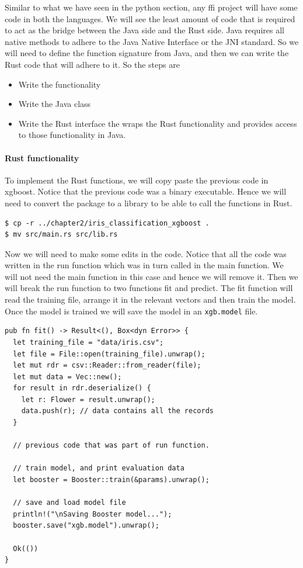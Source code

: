 \documentclass{book}
\begin{document}
Similar to what we have seen in the python section, any ffi project will have some code in both the languages. We will see the least amount of code that is required to act as the bridge between the Java side and the Rust side. Java requires all native methods to adhere to the Java Native Interface or the JNI standard. So we will need to define the function signature from Java, and then we can write the Rust code that will adhere to it. So the steps are

\begin{itemize}
	\item Write the functionality
	\item Write the Java class
	\item Write the Rust interface the wraps the Rust functionality and provides access to those functionality in Java.
\end{itemize}

\paragraph{Rust functionality}%
To implement the Rust functions, we will copy paste the previous code in xgboost. Notice that the previous code was a binary executable. Hence we will need to convert the package to a library to be able to call the functions in Rust.

\begin{lstlisting}[caption={}, basicstyle=\small]
$ cp -r ../chapter2/iris_classification_xgboost .
$ mv src/main.rs src/lib.rs
\end{lstlisting}

Now we will need to make some edits in the code. Notice that all the code was written in the run function which was in turn called in the main function. We will not need the main function in this case and hence we will remove it. Then we will break the run function to two functions fit and predict. The fit function will read the training file, arrange it in the relevant vectors and then train the model. Once the model is trained we will save the model in an \lstinline{xgb.model} file.

\begin{lstlisting}[caption={chapter8/iris\_classification\_xgboost/iris\_classification\_library/src/lib.rs}, basicstyle=\small]
pub fn fit() -> Result<(), Box<dyn Error>> {
  let training_file = "data/iris.csv";
  let file = File::open(training_file).unwrap();
  let mut rdr = csv::Reader::from_reader(file);
  let mut data = Vec::new();
  for result in rdr.deserialize() {
    let r: Flower = result.unwrap();
    data.push(r); // data contains all the records
  }

  // previous code that was part of run function.

  // train model, and print evaluation data
  let booster = Booster::train(&params).unwrap();

  // save and load model file
  println!("\nSaving Booster model...");
  booster.save("xgb.model").unwrap();

  Ok(())
}
\end{lstlisting}
\end{document}
